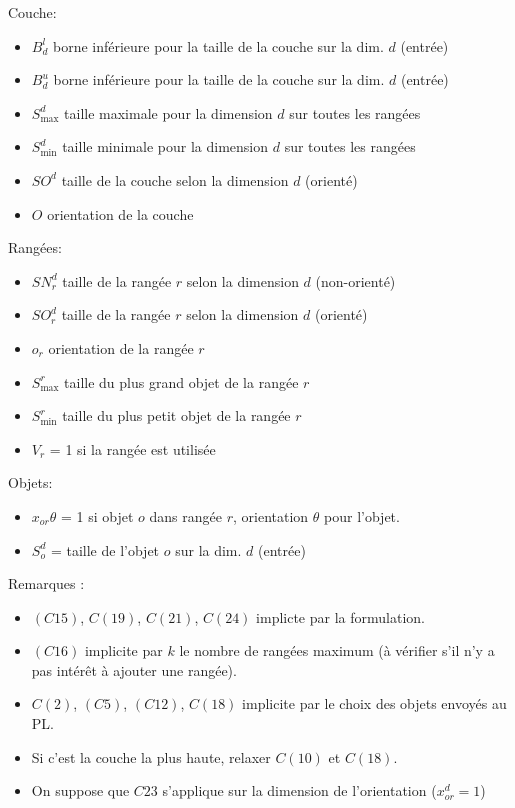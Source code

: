 \documentclass[10pt]{article}
\begin{document}
Couche:
\begin{itemize}
    \item{$B_d^l$ borne inférieure pour la taille de la couche sur la dim. $d$ (entrée)}
    \item{$B_d^u$ borne inférieure pour la taille de la couche sur la dim. $d$ (entrée)}
    \item{$S_{\max}^d$ taille maximale pour la dimension $d$ sur toutes les rangées}
    \item{$S_{\min}^d$ taille minimale pour la dimension $d$ sur toutes les rangées}
    \item{$SO^d$ taille de la couche selon la dimension $d$ (orienté)}
    \item{$O$ orientation de la couche}
\end{itemize}

Rangées:
\begin{itemize}
    \item{$SN_r^d$ taille de la rangée $r$ selon la dimension $d$ (non-orienté)}
    \item{$SO_r^d$ taille de la rangée $r$ selon la dimension $d$ (orienté)}
    \item{$o_r$ orientation de la rangée $r$}
    \item{$S_{\max}^r$ taille du plus grand objet de la rangée $r$}
    \item{$S_{\min}^r$ taille du plus petit objet de la rangée $r$}
    \item{$V_r$ = 1 si la rangée est utilisée}
\end{itemize}

Objets:
\begin{itemize}
    \item{$x_{or}{\theta}$ = 1 si objet $o$ dans rangée $r$, orientation $\theta$ pour l'objet.}
    \item{$S_o^d$ = taille de l'objet $o$ sur la dim. $d$ (entrée)}
\end{itemize}

Remarques : 
\begin{itemize}
    \item{$(C15)$, $C(19)$, $C(21)$, $C(24)$ implicte par la formulation.}
    \item{$(C16)$ implicite par $k$ le nombre de rangées maximum (à vérifier s'il n'y a pas intérêt à ajouter une rangée).}
    \item{$C(2)$, $(C5)$, $(C12)$, $C(18)$ implicite par le choix des objets envoyés au PL.}
    \item{Si c'est la couche la plus haute, relaxer $C(10)$ et $C(18)$.}
    \item{On suppose que $C23$ s'applique sur la dimension de l'orientation ($x_{or}^d = 1$)}
\end{itemize}
\end{document}
